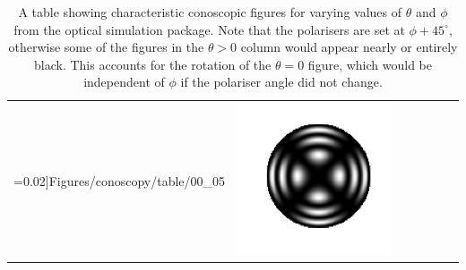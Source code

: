 \begin{center}
\begin{table}[ht]
\begin{tabular}{ccCCCCC}
=0.02]{Figures/conoscopy/table/00_05}&\includegraphics[scale=0.02]{Figures/conoscopy/table/00_00}\\
\end{tabular}
\caption[Characteristic conoscopic figures]{\label{fig:figures}A table showing characteristic conoscopic figures for varying values of $\theta$ and $\phi$ from the optical simulation package. Note that the polarisers are set at $\phi+45^{\circ}$, otherwise some of the figures in the $\theta>0$ column would appear nearly or entirely black. This accounts for the rotation of the $\theta=0$ figure, which would be independent of $\phi$ if the polariser angle did not change.}
\end{table}
\end{center}

